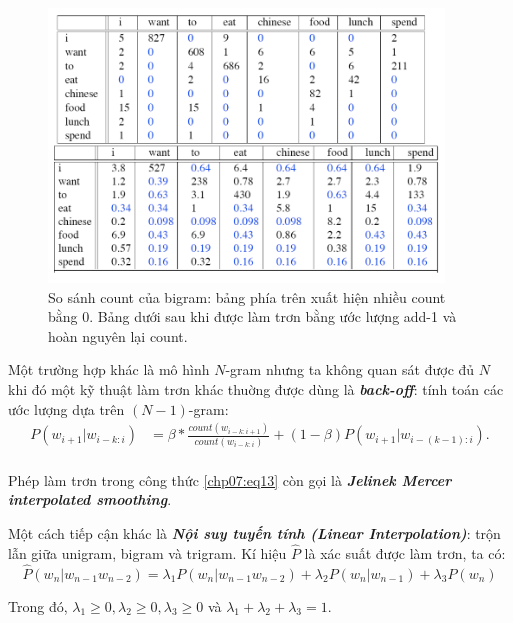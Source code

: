 \begin{figure}[H]
    \centering
    \includegraphics[width=10.5cm]{chapter07/figure-sec12/smoothing.png}
    \caption{So sánh count của bigram: bảng phía trên xuất hiện nhiều count bằng $0$. Bảng dưới sau khi được làm trơn bằng ước lượng add-1 và hoàn nguyên lại count.}
    \label{fig:smoothing}
\end{figure}

Một trường hợp khác là mô hình $N$-gram nhưng ta không quan sát được đủ $N$ khi đó một kỹ thuật làm trơn khác thuờng được dùng là \textbf{\textit{back-off}}: tính toán các ước lượng dựa trên $(N-1)$-gram:
\begin{equation}
\label{chp07:eq13}
\begin{split}
P(w_{i+1}|w_{i-k:i})&=\beta*\frac{count(w_{i-k:i+1})}{count(w_{i-k:i})}+(1-\beta)P(w_{i+1}|w_{i-(k-1):i}).\\
\end{split}
\end{equation}

Phép làm trơn trong công thức \ref{chp07:eq13} còn gọi là \textbf{\textit{Jelinek Mercer interpolated smoothing}}.

Một cách tiếp cận khác là \textbf{\textit{Nội suy tuyến tính (Linear Interpolation)}}: trộn lẫn giữa unigram, bigram và trigram. Kí hiệu $\hat{P}$ là xác suất được làm trơn, ta có:
$$\hat{P}(w_n|w_{n-1}w_{n-2})=\lambda_1 P(w_n|w_{n-1}w_{n-2})+\lambda_2 P(w_n|w_{n-1})+\lambda_3 P(w_n)$$

Trong đó, $\lambda_1 \geq 0,\lambda_2 \geq 0,\lambda_3 \geq 0$ và $\lambda_1 +\lambda_2 + \lambda_3 =1$.
